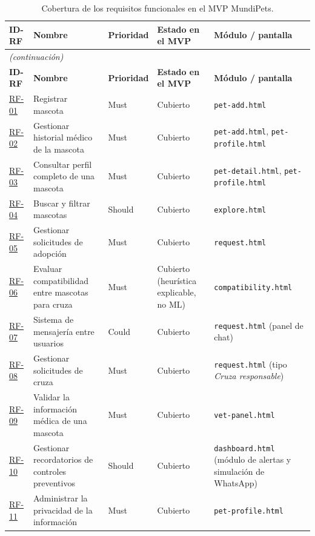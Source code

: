 \documentclass[journal,onecolumn]{IEEEtran}
\begin{document}
	\begin{longtable}{@{}p{1.5cm} p{5.2cm} p{1.7cm} p{3.0cm} p{3.4cm}@{}}
		\caption{Cobertura de los requisitos funcionales en el MVP MundiPets.}
		\label{tab:cobertura-mvp} \\
		\hline
		\textbf{ID-RF} & \textbf{Nombre} & \textbf{Prioridad} & \textbf{Estado en el MVP} & \textbf{Módulo / pantalla} \\
		\hline
		\endfirsthead
		\multicolumn{5}{|l|}{\textit{(continuación)}} \\
		\hline
		\textbf{ID-RF} & \textbf{Nombre} & \textbf{Prioridad} & \textbf{Estado en el MVP} & \textbf{Módulo / pantalla} \\
		\hline
		\endhead
		\hline
		\endfoot
		\hyperref[tab:RF-01]{RF-01} & Registrar mascota & Must & Cubierto & \texttt{pet-add.html} \\
		\hline
		\hyperref[tab:RF-02]{RF-02} & Gestionar historial médico de la mascota & Must & Cubierto & \texttt{pet-add.html}, \texttt{pet-profile.html} \\
		\hline
		\hyperref[tab:RF-03]{RF-03} & Consultar perfil completo de una mascota & Must & Cubierto & \texttt{pet-detail.html}, \texttt{pet-profile.html} \\
		\hline
		\hyperref[tab:RF-04]{RF-04} & Buscar y filtrar mascotas & Should & Cubierto & \texttt{explore.html} \\
		\hline
		\hyperref[tab:RF-05]{RF-05} & Gestionar solicitudes de adopción & Must & Cubierto & \texttt{request.html} \\
		\hline
		\hyperref[tab:RF-06]{RF-06} & Evaluar compatibilidad entre mascotas para cruza & Must & Cubierto (heurística explicable, no ML) & \texttt{compatibility.html} \\
		\hline
		\hyperref[tab:RF-07]{RF-07} & Sistema de mensajería entre usuarios & Could & Cubierto & \texttt{request.html} (panel de chat) \\
		\hline
		\hyperref[tab:RF-08]{RF-08} & Gestionar solicitudes de cruza & Must & Cubierto & \texttt{request.html} (tipo \emph{Cruza responsable}) \\
		\hline
		\hyperref[tab:RF-09]{RF-09} & Validar la información médica de una mascota & Must & Cubierto & \texttt{vet-panel.html} \\
		\hline
		\hyperref[tab:RF-10]{RF-10} & Gestionar recordatorios de controles preventivos & Should & Cubierto & \texttt{dashboard.html} (módulo de alertas y simulación de WhatsApp) \\
		\hline
		\hyperref[tab:RF-11]{RF-11} & Administrar la privacidad de la información & Must & Cubierto & \texttt{pet-profile.html} \\

\end{longtable}
\end{document}
